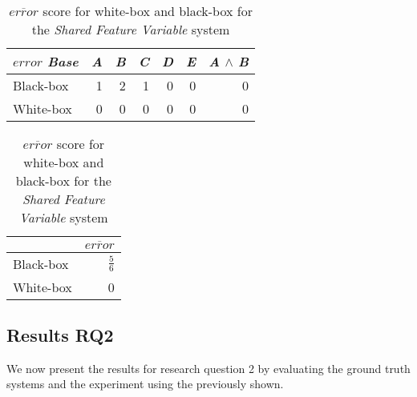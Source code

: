         \begin{table}[H]
            \begin{minipage}{.5\linewidth}
                \centering
                \begin{tabular}{lrrrrrr}    \toprule
                $error$    \emph{Base} & \emph{A} & \emph{B} & \emph{C} & \emph{D} & \emph{E} & \emph{A} $\land$ \emph{B}   \\ \midrule
                Black-box & 1 & 2 & 1 & 0 & 0 & 0       \\
                White-box & 0 & 0 & 0 & 0 & 0 & 0      \\ \bottomrule
                \end{tabular}
                \caption{Respective \emph{error} scores for white-box and black-box {\perfInfluenceModel}s for the \emph{Shared Feature Variable} system.}
                \label{rq1:shared-feature-variable}
            \end{minipage}%
            \hspace{7mm}
        \begin{minipage}{.37\linewidth}
            \centering
            \begin{tabular}{lr}
                \toprule
                            & $\overline{error}$   \\ \midrule
                Black-box & $\frac{5}{6}$              \\
                White-box & 0              \\ \bottomrule
                \end{tabular}
                \caption{$\overline{error}$ score for white-box and black-box for the \emph{Shared Feature Variable} system}
                \label{rq1:shared-feature-variable-mean}
            \end{minipage}
        \end{table}


\subsection{Results RQ2}

We now present the results for research question 2 by evaluating the ground truth systems and the experiment using the {\perfInfluenceModel} 
previously shown.

